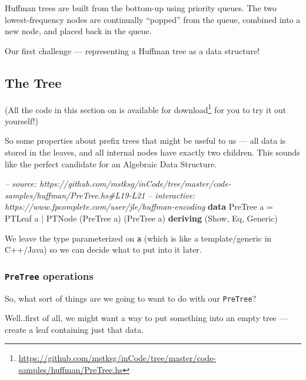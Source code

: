 \documentclass[]{article}
\newenvironment{Shaded}{}{}
\newcommand{\KeywordTok}[1]{\textcolor[rgb]{0.00,0.44,0.13}{\textbf{#1}}}
\newcommand{\DataTypeTok}[1]{\textcolor[rgb]{0.56,0.13,0.00}{#1}}
\newcommand{\CommentTok}[1]{\textcolor[rgb]{0.38,0.63,0.69}{\textit{#1}}}
\newcommand{\FunctionTok}[1]{\textcolor[rgb]{0.02,0.16,0.49}{#1}}
\newcommand{\NormalTok}[1]{#1}
\renewcommand{\href}[2]{#2\footnote{\url{#1}}}
\begin{document}
Huffman trees are built from the bottom-up using priority queues. The two
lowest-frequency nodes are continually ``popped'' from the queue, combined into
a new node, and placed back in the queue.

Our first challenge --- representing a Huffman tree as a data structure!

\subsection{The Tree}\label{the-tree}

(All the code in this section on is
\href{https://github.com/mstksg/inCode/tree/master/code-samples/huffman/PreTree.hs}{available
for download} for you to try it out yourself!)

So some properties about prefix trees that might be useful to us --- all data is
stored in the leaves, and all internal nodes have exactly two children. This
sounds like the perfect candidate for an Algebraic Data Structure.

\begin{Shaded}
\begin{Highlighting}[]
\CommentTok{-- source: https://github.com/mstksg/inCode/tree/master/code-samples/huffman/PreTree.hs#L19-L21}
\CommentTok{-- interactive: https://www.fpcomplete.com/user/jle/huffman-encoding}
\KeywordTok{data} \DataTypeTok{PreTree}\NormalTok{ a }\FunctionTok{=} \DataTypeTok{PTLeaf}\NormalTok{ a}
               \FunctionTok{|} \DataTypeTok{PTNode}\NormalTok{ (}\DataTypeTok{PreTree}\NormalTok{ a) (}\DataTypeTok{PreTree}\NormalTok{ a)}
               \KeywordTok{deriving}\NormalTok{ (}\DataTypeTok{Show}\NormalTok{, }\DataTypeTok{Eq}\NormalTok{, }\DataTypeTok{Generic}\NormalTok{)}
\end{Highlighting}
\end{Shaded}

We leave the type parameterized on \texttt{a} (which is like a template/generic
in C++/Java) so we can decide what to put into it later.

\subsubsection{\texorpdfstring{\texttt{PreTree}
operations}{PreTree operations}}\label{pretree-operations}

So, what sort of things are we going to want to do with our \texttt{PreTree}?

Well..first of all, we might want a way to put something into an empty tree ---
create a leaf containing just that data.
\end{document}
